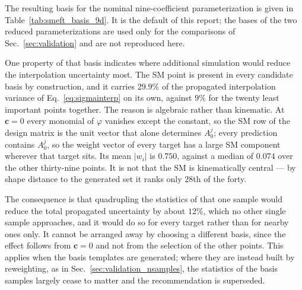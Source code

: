 The resulting basis for the nominal nine-coefficient parameterization is given in
Table~\ref{tab:smeft_basis_9d}. It is the default of this report; the bases of the
two reduced parameterizations are used only for the comparisons of
Sec.~\ref{sec:validation} and are not reproduced here.



One property of that basis indicates where additional simulation would reduce the
interpolation uncertainty most. The SM point is present in
every candidate basis by construction, and it carries $29.9\%$ of the propagated
interpolation variance of Eq.~\eqref{eq:sigmainterp} on its own, against $9\%$ for the
twenty least important points together. The reason is algebraic rather than kinematic.
At $\mathbf{c}=0$ every monomial of $\varphi$ vanishes except the constant, so the
SM row of the design matrix is the unit vector that alone determines
$A^j_0$; every prediction contains $A^j_0$, so the weight vector of every target has a
large SM component wherever that target sits. Its mean $|w_i|$ is $0.750$,
against a median of $0.074$ over the other thirty-nine points. It is not that the
SM is kinematically central --- by shape distance to the generated set it
ranks only $28$th of the forty.

The consequence is that quadrupling the statistics of that one sample would reduce the
total propagated uncertainty by about $12\%$, which no other single sample approaches,
and it would do so for every target rather than for nearby ones only. It cannot be
arranged away by choosing a different basis, since the effect follows from
$\mathbf{c}=0$ and not from the selection of the other points. This applies when the
basis templates are generated; where they are instead built by reweighting, as in
Sec.~\ref{sec:validation_nsamples}, the statistics of the basis samples largely cease
to matter and the recommendation is superseded.
